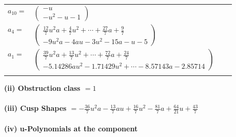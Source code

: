 \documentclass[1p]{elsarticle_modified}
\theoremstyle{definition}
\begin{document}
\begin{tabular}{m{7pt} m{180pt} m{7pt} m{180pt} }
\flushright $a_{10}=$&$\begin{pmatrix}- u\\- u^2- u-1\end{pmatrix}$ \\
\flushright $a_{4}=$&$\begin{pmatrix}\frac{12}{7} u^2 a+\frac{4}{7} u^2+\cdots+\frac{27}{7} a+\frac{9}{7}\\-9 u^2 a-4 a u-3 u^2-15 a- u-5\end{pmatrix}$ \\
\flushright $a_{1}=$&$\begin{pmatrix}\frac{39}{7} u^2 a+\frac{13}{7} u^2+\cdots+\frac{72}{7} a+\frac{24}{7}\\-5.14286 a u^{2}-1.71429 u^{2}+\cdots-8.57143 a-2.85714\end{pmatrix}$\\&\end{tabular}
\flushleft \textbf{(ii) Obstruction class $= 1$}\\~\\
\flushleft \textbf{(iii) Cusp Shapes $= -\frac{36}{7} u^2 a-\frac{13}{7} a u+\frac{16}{7} u^2-\frac{81}{7} a+\frac{64}{21} u+\frac{43}{7}$}\\~\\
\newpage\renewcommand{\arraystretch}{1}
\flushleft \textbf{(iv) u-Polynomials at the component}\newline \\
\end{document}
